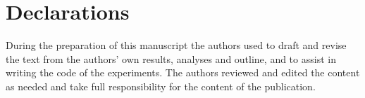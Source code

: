 \section*{Declarations}






During the preparation of this manuscript the authors used \aitool{} to draft and revise the text from the authors' own results, analyses and outline, and to assist in writing the code of the experiments. The authors reviewed and edited the content as needed and take full responsibility for the content of the publication.
